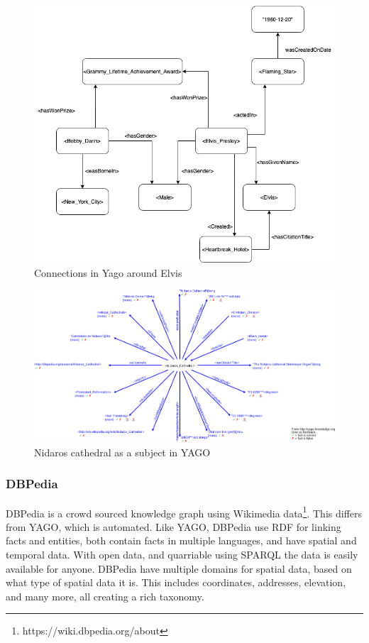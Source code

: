 \begin{figure}[h]
  \centering
  \includegraphics[scale=0.5]{figs/yagoExample.png}
 \caption{Connections in Yago around Elvis}
 \label{fig:Elvis}
\end{figure}
%
\begin{figure}[h]
  \centering
  \includegraphics[scale=0.5]{figs/Nidaros_Cathedral.png}
  \caption[Nidaros cathedral as a subject in YAGO]{Nidaros cathedral as a subject in YAGO\protect\footnotemark}
  \label{fig:Nidaros}
\end{figure}

\subsubsection{DBPedia}
DBPedia is a crowd sourced knowledge graph using Wikimedia data\footnote{https://wiki.dbpedia.org/about}. This differs from YAGO, which is automated. Like YAGO, DBPedia use RDF for linking facts and entities, both contain facts in multiple languages, and have spatial and temporal data. With open data, and quarriable using SPARQL the data is easily available for anyone. DBPedia have multiple domains for spatial data, based on what type of spatial data it is. This includes coordinates, addresses, elevation, and many more, all creating a rich taxonomy.

